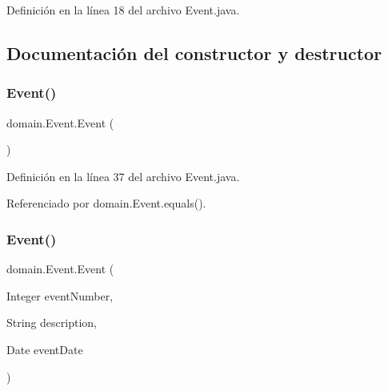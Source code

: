 Definición en la línea 18 del archivo Event.\+java.



\subsection{Documentación del constructor y destructor}
\mbox{\label{classdomain_1_1Event_a1d0bc6f1fb6b0d7f7732ab132c09e868}} 
\subsubsection{\texorpdfstring{Event()}{Event()}\hspace{0.1cm}{\footnotesize\ttfamily [1/3]}}
{\footnotesize\ttfamily domain.\+Event.\+Event (\begin{DoxyParamCaption}{ }\end{DoxyParamCaption})}



Definición en la línea 37 del archivo Event.\+java.


\begin{DoxyCode}{0}

\end{DoxyCode}


Referenciado por domain.\+Event.\+equals().

\mbox{\label{classdomain_1_1Event_ae54063394d89364db7a777096e64d2e0}} 
\subsubsection{\texorpdfstring{Event()}{Event()}\hspace{0.1cm}{\footnotesize\ttfamily [2/3]}}
{\footnotesize\ttfamily domain.\+Event.\+Event (\begin{DoxyParamCaption}\item[{Integer}]{event\+Number,  }\item[{String}]{description,  }\item[{Date}]{event\+Date }\end{DoxyParamCaption})}



